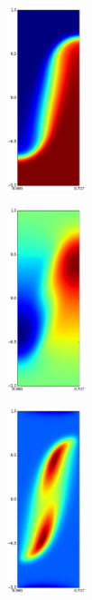 \begin{figure}
\begin{subfigure}[b]{0.25\textwidth}
\includegraphics[width=0.25\textwidth]{gfx/cnv_o16_e32-t_yz-0033}
\end{subfigure}
\begin{subfigure}[b]{0.25\textwidth}
\includegraphics[width=0.25\textwidth]{gfx/cnv_o16_e32-w_yz-0033}
\end{subfigure}
\begin{subfigure}[b]{0.25\textwidth}
\includegraphics[width=0.25\textwidth]{gfx/cnv_o16_e32-vorticity_yz-0033}

\end{subfigure}
\end{figure}
